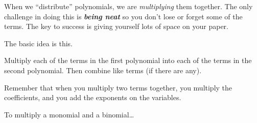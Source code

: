When we ``distribute'' polynomials, we are \emph{multiplying} them together.
The only challenge in doing this
is {\bfseries\itshape being neat} so you don't lose or forget some of the terms.
The key to success is giving yourself lots of space on your paper.

The basic idea is this.
\begin{center}
\begin{tcolorbox}[width=4in]
    Multiply each of the terms in the first polynomial 
    into each of the terms in the second polynomial.
    Then combine like terms (if there are any).
\end{tcolorbox}
\end{center}

Remember that when you multiply two terms together,
you multiply the coefficients, and you add the exponents on the variables.


\begin{myConceptSteps}{To multiply a monomial and a binomial\dots}
\end{myConceptSteps}


